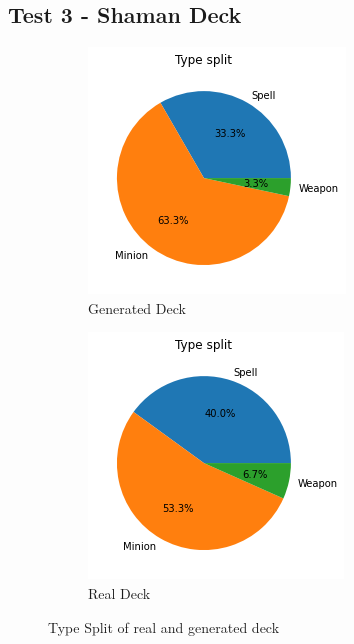 \documentclass{report} %
\begin{document}
\subsection{Test 3 - Shaman Deck}
\begin{figure}[H]
\centering
\begin{subfigure}{.5\textwidth}
  \centering
  \includegraphics[width=.75\linewidth]{TestImages/ShamanDeckSplitFake}
  \caption{Generated Deck}
\end{subfigure}%
\begin{subfigure}{.5\textwidth}
  \centering
  \includegraphics[width=.75\linewidth]{TestImages/ShamanDeckSplitReal}
  \caption{Real Deck}
\end{subfigure}
\caption{Type Split of real and generated deck}
\end{figure}
\end{document}
